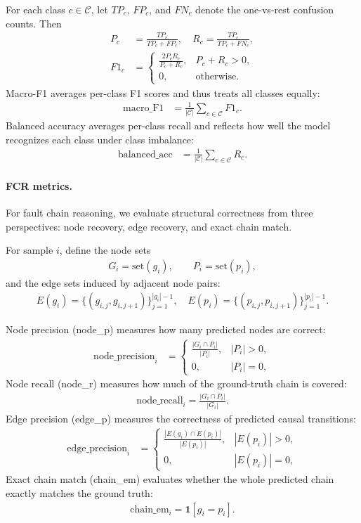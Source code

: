 \documentclass[sigconf,10pt]{acmart} %
\begin{document}
For each class $c\in\mathcal{C}$, let $TP_c$, $FP_c$, and $FN_c$ denote the one-vs-rest confusion counts. Then
\begin{align}
P_c &= \frac{TP_c}{TP_c+FP_c},\quad
R_c = \frac{TP_c}{TP_c+FN_c},\\
F1_c &=
\begin{cases}
\frac{2P_cR_c}{P_c+R_c}, & P_c+R_c>0,\\
0, & \text{otherwise}.
\end{cases}
\end{align}
Macro-F1 averages per-class F1 scores and thus treats all classes equally:
\begin{align}
\mathrm{macro\_F1} &= \frac{1}{|\mathcal{C}|}\sum_{c\in\mathcal{C}}F1_c.
\end{align}
Balanced accuracy averages per-class recall and reflects how well the model recognizes each class under class imbalance:
\begin{align}
\mathrm{balanced\_acc} &= \frac{1}{|\mathcal{C}|}\sum_{c\in\mathcal{C}}R_c.
\end{align}


\paragraph{FCR metrics.}
For fault chain reasoning, we evaluate structural correctness from three perspectives: node recovery, edge recovery, and exact chain match.

For sample $i$, define the node sets
\begin{align}
G_i=\mathrm{set}(g_i), \qquad P_i=\mathrm{set}(p_i),
\end{align}
and the edge sets induced by adjacent node pairs:
\begin{align}
E(g_i)=\{(g_{i,j},g_{i,j+1})\}_{j=1}^{|g_i|-1},\quad
E(p_i)=\{(p_{i,j},p_{i,j+1})\}_{j=1}^{|p_i|-1}.
\end{align}

Node precision (node\_p) measures how many predicted nodes are correct:
\begin{align}
\mathrm{node\_precision}_i &=
\begin{cases}
\frac{|G_i\cap P_i|}{|P_i|}, & |P_i|>0,\\
0, & |P_i|=0,
\end{cases}
\end{align}
Node recall (node\_r) measures how much of the ground-truth chain is covered:
\begin{align}
\mathrm{node\_recall}_i = \frac{|G_i\cap P_i|}{|G_i|}.
\end{align}
Edge precision (edge\_p) measures the correctness of predicted causal transitions:
\begin{align}
\mathrm{edge\_precision}_i &=
\begin{cases}
\frac{|E(g_i)\cap E(p_i)|}{|E(p_i)|}, & |E(p_i)|>0,\\
0, & |E(p_i)|=0,
\end{cases}
\end{align}
Exact chain match (chain\_em) evaluates whether the whole predicted chain exactly matches the ground truth:
\begin{align}
\mathrm{chain\_em}_i = \mathbf{1}[g_i=p_i].
\end{align}
\end{document}
